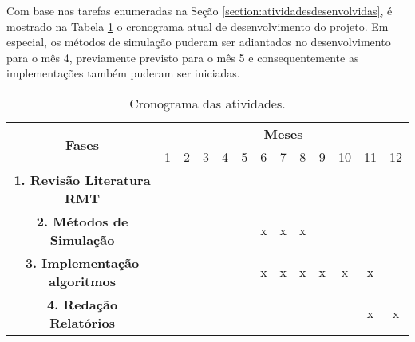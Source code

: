 Com base nas tarefas enumeradas na Seção \ref{section:atividadesdesenvolvidas}, é mostrado na Tabela \ref{tab:cronograma1ano} o cronograma atual de desenvolvimento do projeto. Em especial, os métodos de simulação puderam ser adiantados no desenvolvimento para o mês 4, previamente previsto para o mês 5 e consequentemente as implementações também puderam ser iniciadas.


\begin{table}[ht!]
	\centering
	\begin{tabular}{|c|c|c|c|c|c|c|c|c|c|c|c|c|}
		\hline
		\multirow{2}{*}{{\bf Fases}} & \multicolumn{12}{c|}{{\bf Meses}}
		\\ \cline{2-13}
		& 1 & 2 & 3 & 4 & 5 & 6 & 7 & 8 & 9 & 10 & 11 & 12
		\\ \hline
		{\bf 1. Revisão Literatura RMT} & \checkmark & \checkmark & \checkmark & \checkmark & \checkmark & & & & & & &
		\\ \hline
		{\bf 2. Métodos de Simulação} &  &  &  & \checkmark & \checkmark & x & x & x & & & &
		\\ \hline
		{\bf 3. Implementação algoritmos} & & & & & \checkmark & x & x & x & x & x & x &
		\\ \hline
		{\bf 4. Redação Relatórios} & & & & \checkmark & \checkmark & & & & & & x & x 
		\\ \hline
	\end{tabular}
	\caption{Cronograma das atividades.}
	\label{tab:cronograma1ano}
\end{table}
